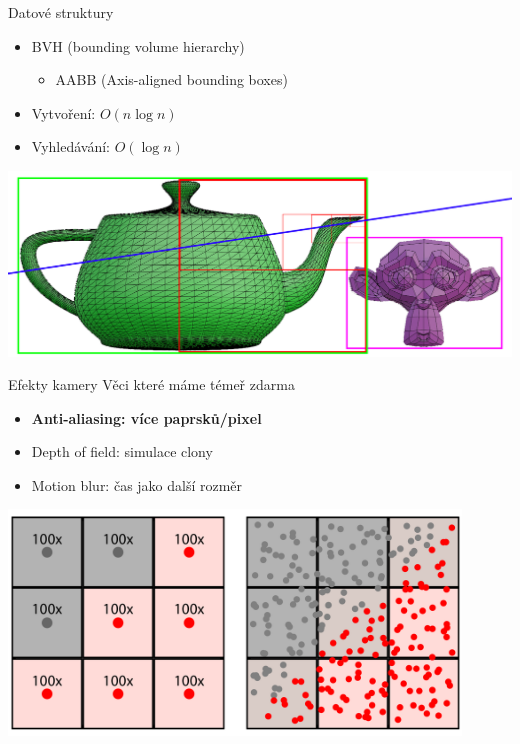 \documentclass[czech]{beamer}
\begin{document}
\begin{frame}{Datové struktury}
\begin{itemize}
  \item BVH (bounding volume hierarchy)
    \begin{itemize}
        \item AABB (Axis-aligned bounding boxes)
    \end{itemize}
  \item Vytvoření: $O(n \log{n})$
  \item Vyhledávání: $O(\log{n})$
\end{itemize}
\centering \includegraphics[width=.95\textwidth]{img/bvh.png}
\end{frame}


\begin{frame}{Efekty kamery}
Věci které máme témeř zdarma
\begin{itemize}
  \item \textbf{Anti-aliasing: více paprsků/pixel}
  \item Depth of field: simulace clony
  \item Motion blur: čas jako další rozměr
\end{itemize}
\vfill
\centering \includegraphics[width=0.9\textwidth]{img/efects AA.png}
\end{frame}
\end{document}
